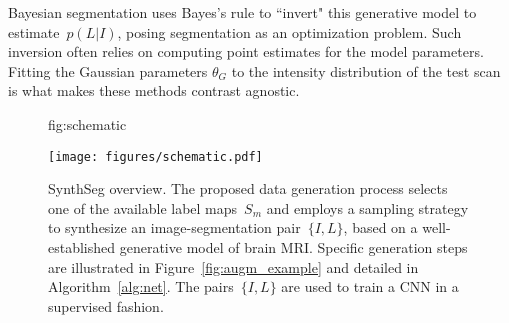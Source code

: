 \documentclass{midl}
\newcommand{\netname}{SynthSeg}
\begin{document}
Bayesian segmentation uses Bayes's rule to ``invert" this generative model to estimate~$p(L|I)$, posing segmentation as an optimization problem. Such inversion often relies on computing point estimates for the model parameters. Fitting the Gaussian parameters $\theta_G$ to the intensity distribution of the test scan is what makes these methods contrast agnostic.

\begin{figure}[t]
\centering
\floatconts
  {fig:schematic}
  {
  \caption{\netname{} overview. The proposed data generation process selects one of the available label maps~$S_m$ and employs a sampling strategy to synthesize an image-segmentation pair~$\{I,L\}$, based on a well-established generative model of brain MRI. Specific generation steps are illustrated in Figure~\ref{fig:augm_example} and detailed in Algorithm~\ref{alg:net}. The pairs~$\{I,L\}$ are used to train a CNN in a supervised fashion.}}
  {\texttt{[image: figures/schematic.pdf]} 
  }
\end{figure}
\begin{algorithm2e}[t]
\caption{Proposed Learning Strategy for \netname{}}
\label{alg:net}
\DontPrintSemicolon
{}
\end{algorithm2e}
\end{document}
